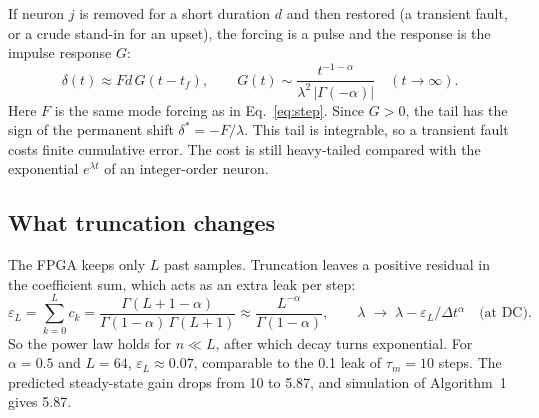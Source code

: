\documentclass[11pt,a4paper]{article}
\begin{document}
If neuron $j$ is removed for a short duration $d$ and then restored (a transient fault, or a crude stand-in for an upset), the forcing is a pulse and the response is the impulse response $G$:
\begin{equation}
\delta(t) \approx F d\, G(t - t_f), \qquad G(t) \sim \frac{t^{-1-\alpha}}{\lambda^{2}\, |\Gamma(-\alpha)|} \quad (t \to \infty).
\label{eq:pulse}
\end{equation}
Here $F$ is the same mode forcing as in Eq.~\eqref{eq:step}. Since $G > 0$, the tail has the sign of the permanent shift $\delta^{*} = -F/\lambda$. This tail is integrable, so a transient fault costs finite cumulative error. The cost is still heavy-tailed compared with the exponential $e^{\lambda t}$ of an integer-order neuron.

\subsection{What truncation changes}
\label{sec:truncation}

The FPGA keeps only $L$ past samples. Truncation leaves a positive residual in the coefficient sum, which acts as an extra leak per step:
\begin{equation}
\varepsilon_L = \sum_{k=0}^{L} c_k = \frac{\Gamma(L+1-\alpha)}{\Gamma(1-\alpha)\,\Gamma(L+1)} \approx \frac{L^{-\alpha}}{\Gamma(1-\alpha)}, \qquad \lambda \;\to\; \lambda - \varepsilon_L / \Delta t^{\alpha} \quad \text{(at DC)}.
\label{eq:epsL}
\end{equation}
So the power law holds for $n \ll L$, after which decay turns exponential. For $\alpha = 0.5$ and $L = 64$, $\varepsilon_L \approx 0.07$, comparable to the 0.1 leak of $\tau_m = 10$ steps. The predicted steady-state gain drops from 10 to 5.87, and simulation of Algorithm~1 gives 5.87.
\end{document}
